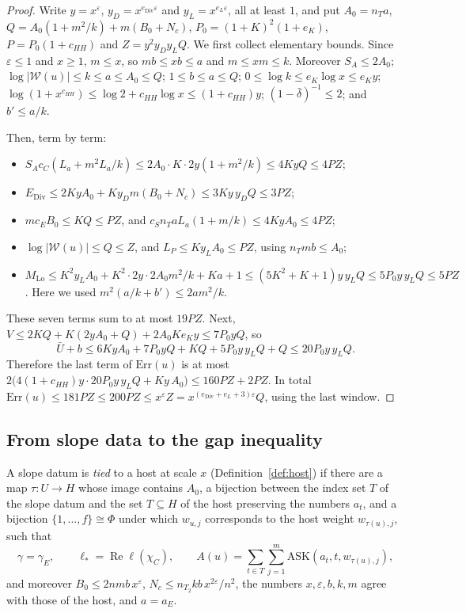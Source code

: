 \documentclass[11pt]{amsart}
\newcommand{\eps}{\varepsilon}
\newcommand{\re}{\operatorname{Re}}
\newcommand{\gE}{\gamma_{E}}
\newcommand{\ASK}{\mathrm{ASK}}
\theoremstyle{plain}
\theoremstyle{definition}
\numberwithin{equation}{section}
\begin{document}
\begin{proof}
Write $y=x^{\eps}$, $y_D=x^{e_{\mathrm{Div}}\eps}$ and $y_L=x^{e_L\eps}$, all at least $1$, and put
$A_0=n_Ta$, $Q=A_0(1+m^2/k)+m(B_0+N_c)$, $P_0=(1+K)^2(1+e_K)$, $P=P_0(1+c_{HH})$ and
$Z=y^2y_Dy_LQ$. We first collect elementary bounds. Since $\eps\le1$ and $x\ge1$, $m\le x$, so
$mb\le xb\le a$ and $m\le xm\le k$. Moreover $S_A\le2A_0$; $\log|\mathcal W(u)|\le k\le a\le A_0\le Q$;
$1\le b\le a\le Q$; $0\le\log k\le e_K\log x\le e_Ky$;
$\log(1+x^{c_{HH}})\le\log2+c_{HH}\log x\le(1+c_{HH})y$; $(1-\bar\delta)^{-1}\le2$; and
$b'\le a/k$.

Then, term by term:
\begin{itemize}
\item $S_Ac_C(L_a+m^2L_a/k)\le2A_0\cdot K\cdot2y(1+m^2/k)\le4KyQ\le4PZ$;
\item $E_{\mathrm{Div}}\le2KyA_0+Ky_Dm(B_0+N_c)\le3Ky\,y_DQ\le3PZ$;
\item $mc_EB_0\le KQ\le PZ$, and $c_Sn_TaL_a(1+m/k)\le4KyA_0\le4PZ$;
\item $\log|\mathcal W(u)|\le Q\le Z$, and $L_P\le Ky_LA_0\le PZ$, using $n_Tmb\le A_0$;
\item $M_{\mathrm{Lo}}\le K^2y_LA_0+K^2\cdot2y\cdot2A_0m^2/k+Ka+1\le(5K^2+K+1)y\,y_LQ\le5P_0y\,y_LQ\le5PZ$.
  Here we used $m^2(a/k+b')\le2am^2/k$.
\end{itemize}
These seven terms sum to at most $19PZ$. Next,
$V\le2KQ+K(2yA_0+Q)+2A_0Ke_Ky\le7P_0yQ$, so
\[
\bar U+b\le6KyA_0+7P_0yQ+KQ+5P_0y\,y_LQ+Q\le20P_0y\,y_LQ.
\]
Therefore the last term of $\mathrm{Err}(u)$ is at most
$2\bigl(4(1+c_{HH})y\cdot20P_0y\,y_LQ+Ky\,A_0\bigr)\le160PZ+2PZ$. In total
$\mathrm{Err}(u)\le181PZ\le200PZ\le x^{\eps}Z=x^{(e_{\mathrm{Div}}+e_L+3)\eps}Q$, using the last window.
\end{proof}

\subsection{From slope data to the gap inequality}

A slope datum is \emph{tied} to a host at scale $x$ (Definition~\ref{def:host}) if there are a map
$\tau:U\to H$ whose image contains $A_0$, a bijection between the index set $T$ of the slope datum
and the set $T\subseteq H$ of the host preserving the numbers $a_t$, and a bijection
$\{1,\dots,f\}\cong\Phi$ under which $w_{u,j}$ corresponds to the host weight $w_{\tau(u),j}$, such that
\[
\gamma=\gE,\qquad \ell_\ast=\re\ell(\chi_C),\qquad A(u)=\sum_{t\in T}\sum_{j=1}^m\ASK(a_t,t,w_{\tau(u),j}),
\]
and moreover $B_0\le2nmb\,x^{\eps}$, $N_c\le n_{T_2}kb\,x^{2\eps}/n^2$, the numbers $x,\eps,b,k,m$
agree with those of the host, and $a=a_E$.
\end{document}
